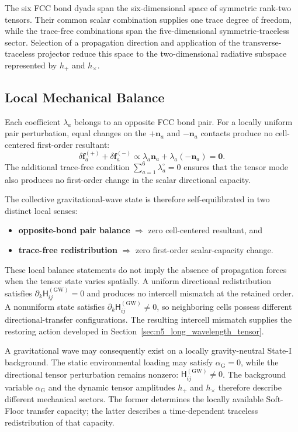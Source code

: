 The six FCC bond dyads span the six-dimensional space of symmetric rank-two tensors. Their common scalar combination supplies one trace degree of freedom, while the trace-free combinations span the five-dimensional symmetric-traceless sector. Selection of a propagation direction and application of the transverse-traceless projector reduce this space to the two-dimensional radiative subspace represented by $h_{+}$ and $h_{\times}$.

\subsection{Local Mechanical Balance}
\label{subsec:local_mechanical_balance}

Each coefficient $\lambda_{a}$ belongs to an opposite FCC bond pair. For a locally uniform pair perturbation, equal changes on the $+\mathbf{n}_{a}$ and $-\mathbf{n}_{a}$ contacts produce no cell-centered first-order resultant:
\begin{equation}
    \delta\mathbf{f}_{a}^{(+)} + \delta\mathbf{f}_{a}^{(-)} \propto \lambda_{a}\mathbf{n}_{a} + \lambda_{a}(-\mathbf{n}_{a}) = \mathbf{0}.
\end{equation}
The additional trace-free condition $\sum_{a=1}^{6}\lambda_{a}^{\circ}=0$ ensures that the tensor mode also produces no first-order change in the scalar directional capacity.

The collective gravitational-wave state is therefore self-equilibrated in two distinct local senses:
\begin{itemize}
    \item \textbf{opposite-bond pair balance} $\Longrightarrow$ zero cell-centered resultant, and
    \item \textbf{trace-free redistribution} $\Longrightarrow$ zero first-order scalar-capacity change.
\end{itemize}

These local balance statements do not imply the absence of propagation forces when the tensor state varies spatially. A uniform directional redistribution satisfies $\partial_{k}\mathsf{H}_{ij}^{(\mathrm{GW})}=0$ and produces no intercell mismatch at the retained order. A nonuniform state satisfies $\partial_{k}\mathsf{H}_{ij}^{(\mathrm{GW})}\neq 0$, so neighboring cells possess different directional-transfer configurations. The resulting intercell mismatch supplies the restoring action developed in Section~\ref{sec:n5_long_wavelength_tensor}.

A gravitational wave may consequently exist on a locally gravity-neutral State-I background. The static environmental loading may satisfy $\alpha_{\mathrm{G}}=0$, while the directional tensor perturbation remains nonzero: $\mathsf{H}_{ij}^{(\mathrm{GW})}\neq 0$. The background variable $\alpha_{\mathrm{G}}$ and the dynamic tensor amplitudes $h_{+}$ and $h_{\times}$ therefore describe different mechanical sectors. The former determines the locally available Soft-Floor transfer capacity; the latter describes a time-dependent traceless redistribution of that capacity.

